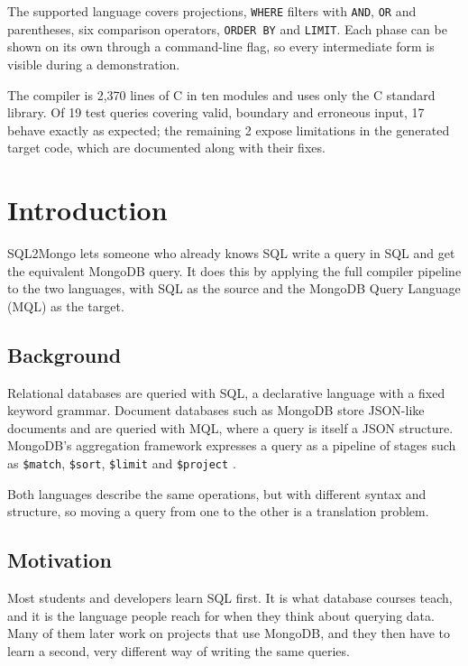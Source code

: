 \documentclass[12pt,a4paper]{report}
\newcommand{\codeus}{\textunderscore\allowbreak}
\DeclareRobustCommand{\code}[1]{\texttt{\let\_\codeus #1}}
\begin{document}
The supported language covers projections, \code{WHERE} filters with \code{AND}, \code{OR} and parentheses, six comparison operators, \code{ORDER BY} and \code{LIMIT}. Each phase can be shown on its own through a command-line flag, so every intermediate form is visible during a demonstration.

The compiler is 2,370 lines of C in ten modules and uses only the C standard library. Of 19 test queries covering valid, boundary and erroneous input, 17 behave exactly as expected; the remaining 2 expose limitations in the generated target code, which are documented along with their fixes.

\tableofcontents

\cleardoublepage
{}

\chapter{Introduction}
SQL2Mongo lets someone who already knows SQL write a query in SQL and get the equivalent MongoDB query. It does this by applying the full compiler pipeline to the two languages, with SQL as the source and the MongoDB Query Language (MQL) as the target.

\section{Background}
Relational databases are queried with SQL, a declarative language with a fixed keyword grammar. Document databases such as MongoDB store JSON-like documents and are queried with MQL, where a query is itself a JSON structure. MongoDB's aggregation framework expresses a query as a pipeline of stages such as \code{\$match}, \code{\$sort}, \code{\$limit} and \code{\$project} \cite{mongo-pipeline}.

Both languages describe the same operations, but with different syntax and structure, so moving a query from one to the other is a translation problem.

\section{Motivation}
Most students and developers learn SQL first. It is what database courses teach, and it is the language people reach for when they think about querying data. Many of them later work on projects that use MongoDB, and they then have to learn a second, very different way of writing the same queries.
\end{document}
